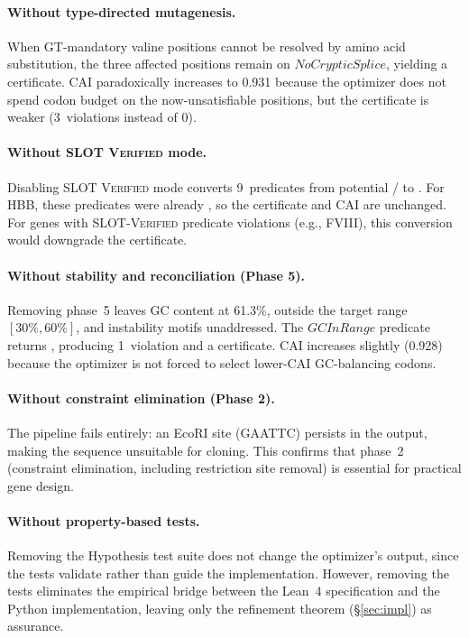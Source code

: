 \paragraph{Without type-directed mutagenesis.}
When GT-mandatory valine positions cannot be resolved by amino acid
substitution, the three affected positions remain \FAIL{} on
$\mathit{NoCrypticSplice}$, yielding a \BRONZE{} certificate.  CAI
paradoxically increases to 0.931 because the optimizer does not spend
codon budget on the now-unsatisfiable positions, but the certificate is
weaker (3~violations instead of 0).

\paragraph{Without SLOT \textsc{Verified} mode.}
Disabling SLOT \textsc{Verified} mode converts 9~predicates from
potential \PASS/\FAIL{} to \UNCERTAIN.  For HBB, these predicates were
already \PASS, so the certificate and CAI are unchanged.  For genes with
SLOT-\textsc{Verified} predicate violations (e.g., FVIII), this
conversion would downgrade the certificate.

\paragraph{Without stability and reconciliation (Phase 5).}
Removing phase~5 leaves GC content at 61.3\%, outside the target range
$[30\%, 60\%]$, and instability motifs unaddressed.  The
$\mathit{GCInRange}$ predicate returns \FAIL, producing 1~violation
and a \BRONZE{} certificate.  CAI increases slightly (0.928) because
the optimizer is not forced to select lower-CAI GC-balancing codons.

\paragraph{Without constraint elimination (Phase 2).}
The pipeline fails entirely: an EcoRI site (GAATTC) persists in the
output, making the sequence unsuitable for cloning.  This confirms that
phase~2 (constraint elimination, including restriction site removal) is
essential for practical gene design.

\paragraph{Without property-based tests.}
Removing the Hypothesis test suite does not change the optimizer's
output, since the tests validate rather than guide the implementation.
However, removing the tests eliminates the empirical bridge between the
Lean~4 specification and the Python implementation, leaving only the
refinement theorem (\S\ref{sec:impl}) as assurance.

